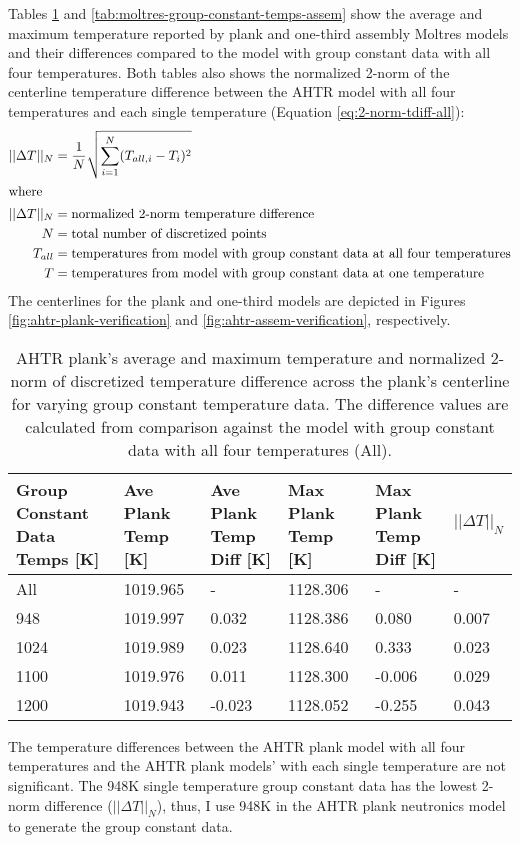 Tables \ref{tab:moltres-group-constant-temps} and \ref{tab:moltres-group-constant-temps-assem}
show the average and maximum temperature reported by plank and one-third assembly Moltres models 
and their differences compared to the model with group constant data with all four temperatures. 
Both tables also shows the normalized 2-norm of the centerline temperature difference between the 
AHTR model with all four temperatures and each single temperature (Equation \ref{eq:2-norm-tdiff-all}):
\begin{align}
    \label{eq:2-norm-tdiff-all}
    ||\Delta T||_N &= \frac{1}{N}\sqrt{\sum_{i=1}^N(T_{all, i} - T_{i})^2} \\
\intertext{where}
    ||\Delta T||_N &= \mbox{normalized 2-norm temperature difference} \nonumber \\
    N &= \mbox{total number of discretized points} \nonumber \\
    T_{all} &= \mbox{temperatures from model with group constant data at all four temperatures} \nonumber \\
    T &= \mbox{temperatures from model with group constant data at one temperature} \nonumber 
\end{align}
The centerlines for the plank and one-third models are depicted in Figures 
\ref{fig:ahtr-plank-verification} and \ref{fig:ahtr-assem-verification}, respectively. 

\begin{table}[htbp]
    \centering
    \onehalfspacing
    \caption{\acrfull{AHTR} plank's average and maximum temperature and normalized 
    2-norm of discretized temperature difference across the plank's centerline for 
    varying group constant temperature data. The difference values are calculated from 
    comparison against the model with group constant data with all four temperatures 
    (All).}
	\label{tab:moltres-group-constant-temps}
    \scriptsize
    \begin{tabular}{p{2.5cm}p{2cm}p{2.4cm}p{2cm}p{2.4cm}p{2cm}}
    \hline 
    \textbf{Group Constant Data Temps [K]}& \textbf{Ave Plank Temp [K]}& 
    \textbf{Ave Plank Temp Diff [K]}& \textbf{Max Plank Temp [K]} & 
    \textbf{Max Plank Temp Diff [K]} & $||\Delta T||_N$ \\ 
    \hline 
    All  & 1019.965 &  -     & 1128.306 & -      & -    \\
    948 & 1019.997 &  0.032 & 1128.386 &  0.080 & 0.007\\
    1024 & 1019.989 &  0.023 & 1128.640 &  0.333 & 0.023 \\
    1100 & 1019.976 &  0.011 & 1128.300 & -0.006 & 0.029 \\
    1200 & 1019.943 & -0.023 & 1128.052 & -0.255 & 0.043 \\
    \hline
    \end{tabular}
\end{table}
The temperature differences between the AHTR plank model with all four temperatures 
and the AHTR plank models' with each single temperature are not significant. 
The 948K single temperature group constant data has the lowest 2-norm difference 
($||\Delta T||_N$), thus, I use 948K in the \gls{AHTR} plank neutronics model to 
generate the group constant data.

